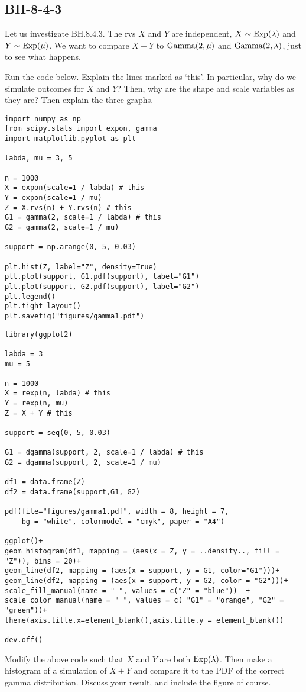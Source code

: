 \subsection{BH-8-4-3}
\label{sec:sum-two-gamma}

Let us investigate BH.8.4.3. The rvs $X$ and $Y$ are independent, $X\sim\mathrm{Exp}(\lambda)$ and $Y\sim\mathrm{Exp}(\mu)$. We want to compare $X+Y$ to $\mathrm{Gamma}(2, \mu)$ and $\mathrm{Gamma}(2, \lambda)$, just to see what happens.

\begin{exercise}
Run the  code below. Explain the lines marked as `this'. In particular, why do we simulate outcomes for $X$ and $Y$? Then, why are the shape and scale variables as they are? Then explain the three graphs.
\begin{verbatim}
import numpy as np
from scipy.stats import expon, gamma
import matplotlib.pyplot as plt

labda, mu = 3, 5

n = 1000
X = expon(scale=1 / labda) # this
Y = expon(scale=1 / mu)
Z = X.rvs(n) + Y.rvs(n) # this
G1 = gamma(2, scale=1 / labda) # this
G2 = gamma(2, scale=1 / mu)

support = np.arange(0, 5, 0.03)

plt.hist(Z, label="Z", density=True)
plt.plot(support, G1.pdf(support), label="G1")
plt.plot(support, G2.pdf(support), label="G2")
plt.legend()
plt.tight_layout()
plt.savefig("figures/gamma1.pdf")
\end{verbatim}

\begin{verbatim}
library(ggplot2)

labda = 3
mu = 5

n = 1000
X = rexp(n, labda) # this
Y = rexp(n, mu)
Z = X + Y # this

support = seq(0, 5, 0.03)

G1 = dgamma(support, 2, scale=1 / labda) # this
G2 = dgamma(support, 2, scale=1 / mu)

df1 = data.frame(Z)
df2 = data.frame(support,G1, G2)

pdf(file="figures/gamma1.pdf", width = 8, height = 7,
    bg = "white", colormodel = "cmyk", paper = "A4")

ggplot()+
geom_histogram(df1, mapping = (aes(x = Z, y = ..density.., fill = "Z")), bins = 20)+
geom_line(df2, mapping = (aes(x = support, y = G1, color="G1")))+
geom_line(df2, mapping = (aes(x = support, y = G2, color = "G2")))+
scale_fill_manual(name = " ", values = c("Z" = "blue"))  +
scale_color_manual(name = " ", values = c( "G1" = "orange", "G2" = "green"))+
theme(axis.title.x=element_blank(),axis.title.y = element_blank())

dev.off()
\end{verbatim}
\end{exercise}

\begin{exercise}
Modify the above code such that $X$ and $Y$ are both $\mathrm{Exp}(\lambda)$. Then make a histogram of a simulation of $X+Y$ and compare it to the PDF of the correct gamma  distribution. Discuss your result, and include the figure of course.
\end{exercise}
